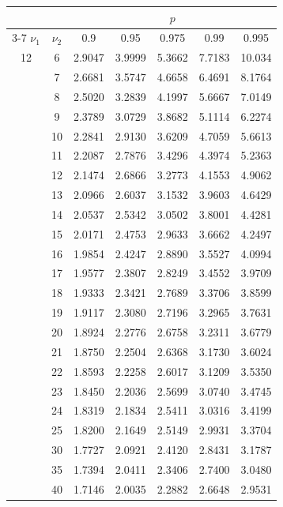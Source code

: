 \hfill
\begin{minipage}{0.49\textwidth}
	\begin{center}
		\begin{tabular}{ccccccc}
			& & \multicolumn{5}{c}{$p$}\\
			\cline{3-7}
			$\nu_1$ & $\nu_2$ & 0.9 & 0.95 & 0.975 & 0.99 & 0.995 \\
			\midrule
			12 & 6 & 2.9047 & 3.9999 & 5.3662 & 7.7183 & 10.034 \\
			& 7 & 2.6681 & 3.5747 & 4.6658 & 6.4691 & 8.1764 \\
			& 8 & 2.5020 & 3.2839 & 4.1997 & 5.6667 & 7.0149 \\
			& 9 & 2.3789 & 3.0729 & 3.8682 & 5.1114 & 6.2274 \\[5pt]
			& 10 & 2.2841 & 2.9130 & 3.6209 & 4.7059 & 5.6613 \\
			& 11 & 2.2087 & 2.7876 & 3.4296 & 4.3974 & 5.2363 \\
			& 12 & 2.1474 & 2.6866 & 3.2773 & 4.1553 & 4.9062 \\
			& 13 & 2.0966 & 2.6037 & 3.1532 & 3.9603 & 4.6429 \\
			& 14 & 2.0537 & 2.5342 & 3.0502 & 3.8001 & 4.4281 \\
			& 15 & 2.0171 & 2.4753 & 2.9633 & 3.6662 & 4.2497 \\
			& 16 & 1.9854 & 2.4247 & 2.8890 & 3.5527 & 4.0994 \\
			& 17 & 1.9577 & 2.3807 & 2.8249 & 3.4552 & 3.9709 \\
			& 18 & 1.9333 & 2.3421 & 2.7689 & 3.3706 & 3.8599 \\
			& 19 & 1.9117 & 2.3080 & 2.7196 & 3.2965 & 3.7631 \\[5pt]
			& 20 & 1.8924 & 2.2776 & 2.6758 & 3.2311 & 3.6779 \\
			& 21 & 1.8750 & 2.2504 & 2.6368 & 3.1730 & 3.6024 \\
			& 22 & 1.8593 & 2.2258 & 2.6017 & 3.1209 & 3.5350 \\
			& 23 & 1.8450 & 2.2036 & 2.5699 & 3.0740 & 3.4745 \\
			& 24 & 1.8319 & 2.1834 & 2.5411 & 3.0316 & 3.4199 \\
			& 25 & 1.8200 & 2.1649 & 2.5149 & 2.9931 & 3.3704 \\
			& 30 & 1.7727 & 2.0921 & 2.4120 & 2.8431 & 3.1787 \\
			& 35 & 1.7394 & 2.0411 & 2.3406 & 2.7400 & 3.0480 \\
			& 40 & 1.7146 & 2.0035 & 2.2882 & 2.6648 & 2.9531 \\

\end{tabular}
\end{center}
\end{minipage}
